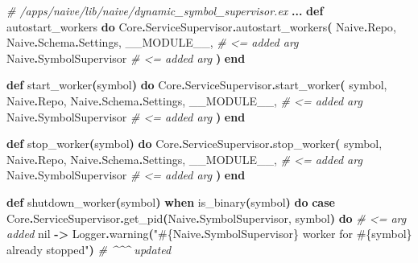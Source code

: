 \documentclass[
  oneside]{book}
\newenvironment{Shaded}{\begin{snugshade}}{\end{snugshade}}
\newcommand{\CommentTok}[1]{\textcolor[rgb]{0.56,0.35,0.01}{\textit{#1}}}
\newcommand{\ConstantTok}[1]{\textcolor[rgb]{0.56,0.35,0.01}{#1}}
\newcommand{\FunctionTok}[1]{\textcolor[rgb]{0.13,0.29,0.53}{\textbf{#1}}}
\newcommand{\KeywordTok}[1]{\textcolor[rgb]{0.13,0.29,0.53}{\textbf{#1}}}
\newcommand{\NormalTok}[1]{#1}
\newcommand{\OperatorTok}[1]{\textcolor[rgb]{0.81,0.36,0.00}{\textbf{#1}}}
\newcommand{\OtherTok}[1]{\textcolor[rgb]{0.56,0.35,0.01}{#1}}
\newcommand{\StringTok}[1]{\textcolor[rgb]{0.31,0.60,0.02}{#1}}
\begin{document}
\begin{Shaded}
\begin{Highlighting}[]
  \CommentTok{\# /apps/naive/lib/naive/dynamic\_symbol\_supervisor.ex}
  \OperatorTok{...}
  \KeywordTok{def}\NormalTok{ autostart\_workers }\KeywordTok{do}
    \ConstantTok{Core}\OperatorTok{.}\ConstantTok{ServiceSupervisor}\OperatorTok{.}\NormalTok{autostart\_workers}\FunctionTok{(}
      \ConstantTok{Naive}\OperatorTok{.}\ConstantTok{Repo}\NormalTok{,}
      \ConstantTok{Naive}\OperatorTok{.}\ConstantTok{Schema}\OperatorTok{.}\ConstantTok{Settings}\NormalTok{,}
      \ConstantTok{\_\_MODULE\_\_}\NormalTok{,             }\CommentTok{\# \textless{}= added arg}
      \ConstantTok{Naive}\OperatorTok{.}\ConstantTok{SymbolSupervisor}  \CommentTok{\# \textless{}= added arg}
    \FunctionTok{)}
  \KeywordTok{end}

  \KeywordTok{def}\NormalTok{ start\_worker}\FunctionTok{(}\NormalTok{symbol}\FunctionTok{)} \KeywordTok{do}
    \ConstantTok{Core}\OperatorTok{.}\ConstantTok{ServiceSupervisor}\OperatorTok{.}\NormalTok{start\_worker}\FunctionTok{(}
\NormalTok{      symbol,}
      \ConstantTok{Naive}\OperatorTok{.}\ConstantTok{Repo}\NormalTok{,}
      \ConstantTok{Naive}\OperatorTok{.}\ConstantTok{Schema}\OperatorTok{.}\ConstantTok{Settings}\NormalTok{,}
      \ConstantTok{\_\_MODULE\_\_}\NormalTok{,             }\CommentTok{\# \textless{}= added arg}
      \ConstantTok{Naive}\OperatorTok{.}\ConstantTok{SymbolSupervisor}  \CommentTok{\# \textless{}= added arg}
    \FunctionTok{)}
  \KeywordTok{end}

  \KeywordTok{def}\NormalTok{ stop\_worker}\FunctionTok{(}\NormalTok{symbol}\FunctionTok{)} \KeywordTok{do}
    \ConstantTok{Core}\OperatorTok{.}\ConstantTok{ServiceSupervisor}\OperatorTok{.}\NormalTok{stop\_worker}\FunctionTok{(}
\NormalTok{      symbol,}
      \ConstantTok{Naive}\OperatorTok{.}\ConstantTok{Repo}\NormalTok{,}
      \ConstantTok{Naive}\OperatorTok{.}\ConstantTok{Schema}\OperatorTok{.}\ConstantTok{Settings}\NormalTok{,}
      \ConstantTok{\_\_MODULE\_\_}\NormalTok{,             }\CommentTok{\# \textless{}= added arg}
      \ConstantTok{Naive}\OperatorTok{.}\ConstantTok{SymbolSupervisor}  \CommentTok{\# \textless{}= added arg}
    \FunctionTok{)}
  \KeywordTok{end}

  \KeywordTok{def}\NormalTok{ shutdown\_worker}\FunctionTok{(}\NormalTok{symbol}\FunctionTok{)} \KeywordTok{when}\NormalTok{ is\_binary}\FunctionTok{(}\NormalTok{symbol}\FunctionTok{)} \KeywordTok{do}
    \KeywordTok{case} \ConstantTok{Core}\OperatorTok{.}\ConstantTok{ServiceSupervisor}\OperatorTok{.}\NormalTok{get\_pid}\FunctionTok{(}\ConstantTok{Naive}\OperatorTok{.}\ConstantTok{SymbolSupervisor}\NormalTok{, symbol}\FunctionTok{)} \KeywordTok{do} \CommentTok{\# \textless{}= arg added}
      \ConstantTok{nil} \OperatorTok{{-}\textgreater{}}
        \ConstantTok{Logger}\OperatorTok{.}\NormalTok{warning}\FunctionTok{(}\StringTok{"}\OtherTok{\#\{}\ConstantTok{Naive}\OperatorTok{.}\ConstantTok{SymbolSupervisor}\OtherTok{\}}\StringTok{ worker for }\OtherTok{\#\{}\NormalTok{symbol}\OtherTok{\}}\StringTok{ already stopped"}\FunctionTok{)}
                                                              \CommentTok{\# \^{}\^{}\^{} updated}


\end{Highlighting}
\end{Shaded}
\end{document}

